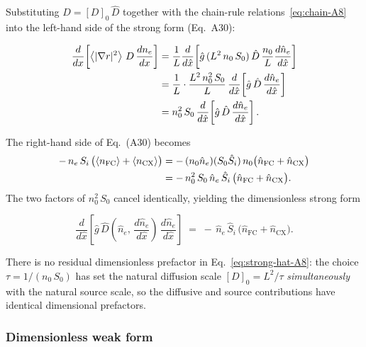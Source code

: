 \documentclass[twocolumn,secnumarabic,amssymb, nobibnotes, aps, prd]{revtex4-2}
\renewcommand{\ne}{n_{e}}  %
\newcommand{\nfc}{n_{\mathrm{FC}}}
\newcommand{\ncx}{n_{\mathrm{CX}}}
\newcommand{\Si}{S_{i}}
\newcommand{\fsa}[1]{\left\langle #1 \right\rangle}
\newcommand{\gradrsq}{\fsa{|\nabla r|^{2}}}
\begin{document}
Substituting $D=[D]_{0}\,\hat{D}$ together with the chain-rule
relations~\eqref{eq:chain-A8} into the left-hand side of the strong
form (Eq.~A30):
\begin{widetext}
\begin{align}
  \frac{d}{dx}\!\left[\gradrsq\,D\,\frac{d\ne}{dx}\right]
  &= \frac{1}{L}\frac{d}{d\hat{x}}\!\left[\hat{g}\,(L^{2}\,n_{0}\,S_{0})\,\hat{D}\,\frac{n_{0}}{L}\frac{d\hat{n}_{e}}{d\hat{x}}\right]
  \notag \\
  &= \frac{1}{L}\cdot\frac{L^{2}\,n_{0}^{2}\,S_{0}}{L}\,\frac{d}{d\hat{x}}\!\left[\hat{g}\,\hat{D}\,\frac{d\hat{n}_{e}}{d\hat{x}}\right]
  \notag \\
  &= n_{0}^{2}\,S_{0}\,\frac{d}{d\hat{x}}\!\left[\hat{g}\,\hat{D}\,\frac{d\hat{n}_{e}}{d\hat{x}}\right].
  \label{eq:LHS-A8}
\end{align}
\end{widetext}
The right-hand side of Eq.~(A30) becomes
\begin{align}
  -\,\ne\,\Si\,\bigl(\fsa{\nfc}+\fsa{\ncx}\bigr)
  &= -\,(n_{0}\hat{n}_{e})(S_{0}\hat{S}_{i})\,n_{0}\bigl(\hat{n}_{\mathrm{FC}}+\hat{n}_{\mathrm{CX}}\bigr)
  \notag \\
  &= -\,n_{0}^{2}\,S_{0}\,\hat{n}_{e}\,\hat{S}_{i}\,\bigl(\hat{n}_{\mathrm{FC}}+\hat{n}_{\mathrm{CX}}\bigr).
  \label{eq:RHS-A8}
\end{align}
The two factors of $n_{0}^{2}\,S_{0}$ cancel identically, yielding the
dimensionless strong form
\begin{widetext}
\begin{equation}
  \frac{d}{d\hat{x}}\!\left[\hat{g}\,\hat{D}\!\left(\hat{n}_{e},\,\frac{d\hat{n}_{e}}{d\hat{x}}\right)\,\frac{d\hat{n}_{e}}{d\hat{x}}\right]
  \;=\;
  -\,\hat{n}_{e}\,\hat{S}_{i}\,\bigl(\hat{n}_{\mathrm{FC}} + \hat{n}_{\mathrm{CX}}\bigr).
  \label{eq:strong-hat-A8}
\end{equation}
\end{widetext}
There is no residual dimensionless prefactor in
Eq.~\eqref{eq:strong-hat-A8}: the choice $\tau=1/(n_{0}\,S_{0})$ has set
the natural diffusion scale $[D]_{0}=L^{2}/\tau$ \emph{simultaneously}
with the natural source scale, so the diffusive and source contributions
have identical dimensional prefactors.

\subsubsection{Dimensionless weak form}
\end{document}
